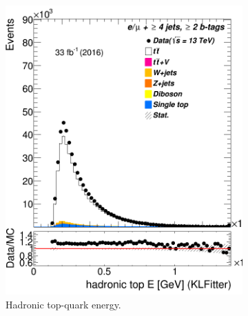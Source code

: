 \begin{figure}
\begin{subfigure}{0.35\textwidth}
		\includegraphics[width=\linewidth]{ControlPlots_emujets_2016_4incl_2incl/klf_topHad_E_emujets_2016.png}
		\caption{Hadronic top-quark energy.} \label{fig:19}
	\end{subfigure}
	\hspace*{1.5cm}	
	\begin{subfigure}{0.35\textwidth}

\end{subfigure}
\end{figure}
